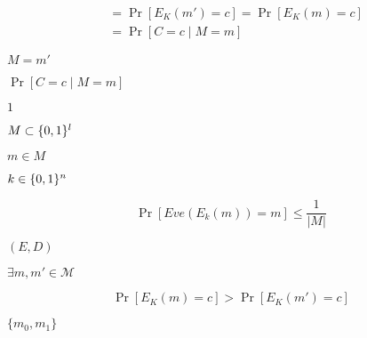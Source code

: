 \documentclass[10pt]{book}
\begin{document}
\begin{mdSnippets}
\begin{mdDisplaySnippet}
\[\begin{aligned}
&= \Pr[E_K(m') = c] = \Pr[E_K(m) = c] \\
&= \Pr[C = c \mid M = m]
\end{aligned}
\]%
\end{mdDisplaySnippet}%
\begin{mdInlineSnippet}[3548382d9f1edad8935499a5315ce4e9]%
$M = m'$\end{mdInlineSnippet}%
\begin{mdInlineSnippet}[9b8aa2e0401d078de0cbc7c383e812d8]%
$\Pr[C = c \mid M = m]$\end{mdInlineSnippet}%
\begin{mdInlineSnippet}[c4ca4238a0b923820dcc509a6f75849b]%
$1$\end{mdInlineSnippet}%
\begin{mdInlineSnippet}[b5a66970cae60832f119a8a704af5954]%
$M \subset \{0,1\}^l$\end{mdInlineSnippet}%
\begin{mdInlineSnippet}%
$m \in M$\end{mdInlineSnippet}%
\begin{mdInlineSnippet}%
$k \in \{0,1\}^n$\end{mdInlineSnippet}%
\begin{mdDisplaySnippet}[d121b31e3b627ec11338f61971c8c898]%
\[%
\Pr[Eve(E_k(m)) = m] \leq \frac{1}{|M|}
\]%
\end{mdDisplaySnippet}%
\begin{mdInlineSnippet}[c150726dc018e82825c0c3617f46a1c9]%
$(E,D)$\end{mdInlineSnippet}%
\begin{mdInlineSnippet}[31089ee4a170700886715e6bedc50862]%
$\exists m,m' \in \mathcal{M}$\end{mdInlineSnippet}%
\begin{mdDisplaySnippet}[3d5ebd79286f6416844682e15a0048bc]%
\[%
\Pr[E_K(m) = c] > \Pr[E_K(m') = c]
\]%
\end{mdDisplaySnippet}%
\begin{mdInlineSnippet}[7c494e382855700c34e01c3d81bed967]%
$\{m_0,m_1\}$\end{mdInlineSnippet}%
\begin{mdInlineSnippet}[1af060cb5720c3ad1d149a16a9d47cac]%

\end{mdInlineSnippet}
\end{mdSnippets}
\end{document}
